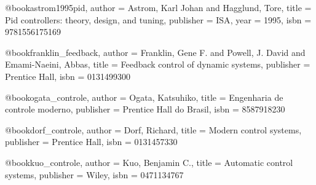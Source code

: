 @book{astrom1995pid,
  author = {Astrom, Karl Johan and Hagglund, Tore},
  title = {Pid controllers: theory, design, and tuning},
  publisher = {ISA},
  year = {1995},
  isbn = {9781556175169}
}

@book{franklin_feedback,
  author = {Franklin, Gene F. and Powell, J. David and Emami-Naeini, Abbas},
  title = {Feedback control of dynamic systems},
  publisher = {Prentice Hall},
  isbn = {0131499300}
}

@book{ogata_controle,
  author = {Ogata, Katsuhiko},
  title = {Engenharia de controle moderno},
  publisher = {Prentice Hall do Brasil},
  isbn = {8587918230}
}

@book{dorf_controle,
  author = {Dorf, Richard},
  title = {Modern control systems},
  publisher = {Prentice Hall},
  isbn = {0131457330}
}

@book{kuo_controle,
  author = {Kuo, Benjamin C.},
  title = {Automatic control systems},
  publisher = {Wiley},
  isbn = {0471134767}
} 